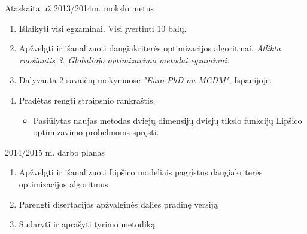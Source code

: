 \documentclass{beamer}
\begin{document}
\begin{frame}[fragile]{\LARGE Ataskaita už 2013/2014m. mokslo metus}
    \begin{enumerate}
        \item Išlaikyti visi egzaminai. Visi įvertinti 10 balų.
        \smallskip
        \item Apžvelgti ir išanalizuoti daugiakriterės optimizacijos
            algoritmai. \footnotesize \textit{Atlikta ruošiantis 3. Globaliojo optimizavimo metodai egzaminui.} \normalsize
        \item Dalyvauta 2 savaičių mokymuose \textit{"Euro PhD on MCDM"}, Ispanijoje.
        \smallskip
        \item Pradėtas rengti straipsnio rankraštis. \\
            \begin{itemize}
        \footnotesize \item Pasiūlytas naujas metodas dviejų dimensijų dviejų tikslo funkcijų Lipšico
            optimizavimo probelmoms spręsti.\normalsize
        \end{itemize}
    \end{enumerate}
\end{frame}

\begin{frame}{2014/2015 m. darbo planas}
    \begin{enumerate}
        \item Apžvelgti ir išanalizuoti Lipšico modeliais pagrįstus
            daugiakriterės optimizacijos algoritmus
        \item Parengti disertacijos apžvalginės dalies pradinę versiją
        \item Sudaryti ir aprašyti tyrimo metodiką
    \end{enumerate}
\end{frame}
\end{document}
